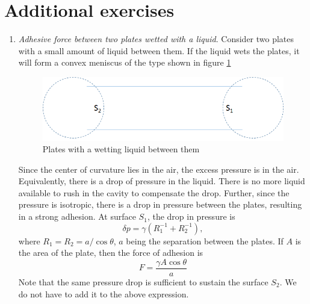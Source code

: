 \section{Additional exercises}
\begin{enumerate}
\item \emph{Adhesive force between two plates wetted with a liquid}. Consider two plates with a small amount of liquid between them. If the liquid wets the plates, it will form a
convex meniscus of the type shown in figure \ref{c1f2}
\begin{figure}[!ht]
\centering
\centerline{\includegraphics[scale=.5]{c1f2}}
\caption{Plates with a wetting liquid between them}
\label{c1f2}
\end{figure}
Since the center of curvature lies in the air, the excess pressure is in the air. Equivalently, there is a drop of pressure in the liquid. There is no more liquid available to rush
in the cavity to compensate the drop. Further, since the pressure is isotropic, there is a drop in pressure between the plates, resulting in a strong adhesion. At surface $S_1$, the
drop in pressure is
\[
\delta{p} = \gamma(R_1^{-1} + R_2^{-1}),
\]
where $R_1 = R_2 = a/\cos\theta$, $a$ being the separation between the plates. If $A$ is the area of the plate, then the force of adhesion is
\[
F = \frac{\gamma A \cos\theta}{a}
\]
Note that the same pressure drop is sufficient to sustain the surface $S_2$. We do not have to add it to the above expression.
\end{enumerate}